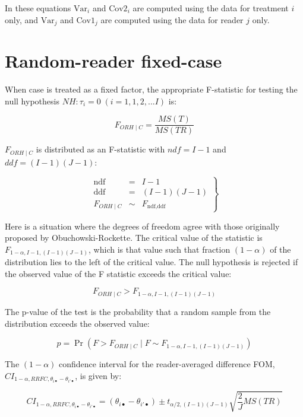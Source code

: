 \documentclass[
]{book}
\begin{document}
In these equations \(\text{Var}_i\) and \(\text{Cov2}_i\) are computed using the data for treatment \(i\) only, and \(\text{Var}_j\) and \(\text{Cov1}_j\) are computed using the data for reader \(j\) only.

\hypertarget{or-analysis-st-rrfc}{%
\section{Random-reader fixed-case}\label{or-analysis-st-rrfc}}

When case is treated as a fixed factor, the appropriate F-statistic for testing the null hypothesis \(NH: \tau_i = 0 \; (i=1,1,2,...I)\) is:

\begin{equation}
F_{ORH \mid C}=\frac{MS(T)}{MS(TR)}
\label{eq:DefFStatRRFC}
\end{equation}

\(F_{ORH \mid C}\) is distributed as an F-statistic with \(ndf = I-1\) and \(ddf = (I-1)(J-1)\):

\begin{equation}
\left.\begin{array}{rcl}
\text{ndf}&=&I-1\\ 
\text{ddf}&=&(I-1)(J-1)\\
F_{ORH \mid C} &\sim& F_{\text{ndf},\text{ddf}}
\end{array}\right\}
\label{eq:FStatRRFC}
\end{equation}

Here is a situation where the degrees of freedom agree with those originally proposed by Obuchowski-Rockette. The critical value of the statistic is \(F_{1-\alpha,I-1,(I-1)(J-1)}\), which is that value such that fraction \((1-\alpha)\) of the distribution lies to the left of the critical value. The null hypothesis is rejected if the observed value of the F statistic exceeds the critical value:

\[F_{ORH \mid C}>F_{1-\alpha,I-1,(I-1)(J-1)}\]

The p-value of the test is the probability that a random sample from the distribution exceeds the observed value:

\[p=\Pr(F>F_{ORH \mid C} \mid F \sim F_{1-\alpha,I-1,(I-1)(J-1)})\]

The \((1-\alpha)\) confidence interval for the reader-averaged difference FOM, \(CI_{1-\alpha,RRFC,\theta_{i \bullet} - \theta_{i' \bullet}}\), is given by:

\begin{equation}
CI_{1-\alpha,RRFC,\theta_{i \bullet} - \theta_{i' \bullet}} = (\theta_{i \bullet} - \theta_{i' \bullet}) \pm t_{\alpha/2, (I-1)(J-1)}\sqrt{\textstyle\frac{2}{J}MS(TR)}
\label{eq:CIDiffFomRRFC}
\end{equation}
\end{document}
